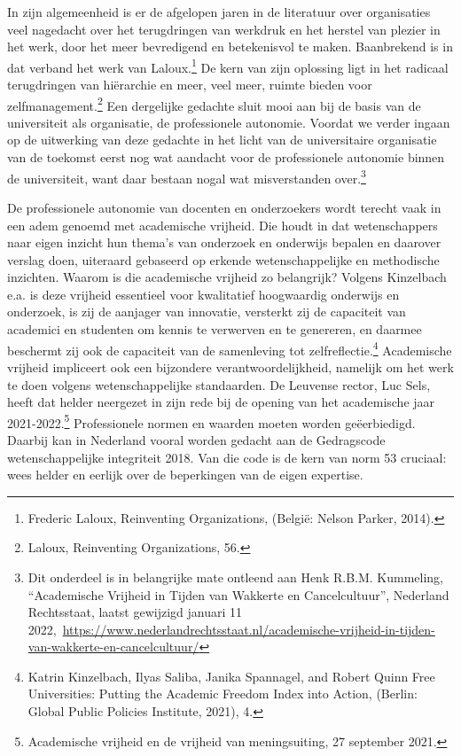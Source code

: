 \documentclass[empirical, authordate, ]{new-jote-article}
\begin{document}
	In zijn algemeenheid is er de afgelopen jaren in de literatuur over organisaties veel nagedacht over het terugdringen van werkdruk en het herstel van plezier in het werk, door het meer bevredigend en betekenisvol te maken. Baanbrekend is in dat verband het werk van Laloux.\footnote{Frederic Laloux, Reinventing Organizations, (België: Nelson Parker, 2014).} De kern van zijn oplossing ligt in het radicaal terugdringen van hiërarchie en meer, veel meer, ruimte bieden voor zelfmanagement.\footnote{Laloux, Reinventing Organizations, 56.} Een dergelijke gedachte sluit mooi aan bij de basis van de universiteit als organisatie, de professionele autonomie. Voordat we verder ingaan op de uitwerking van deze gedachte in het licht van de universitaire organisatie van de toekomst eerst nog wat aandacht voor de professionele autonomie binnen de universiteit, want daar bestaan nogal wat misverstanden over.\footnote{Dit onderdeel is in belangrijke mate ontleend aan Henk R.B.M. Kummeling, “Academische Vrijheid in Tijden van Wakkerte en Cancelcultuur”, Nederland Rechtsstaat, laatst gewijzigd januari 11 2022, \href{https://www.nederlandrechtsstaat.nl/academische-vrijheid-in-tijden-van-wakkerte-en-cancelcultuur/}{https://www.nederlandrechtsstaat.nl/academische-vrijheid-in-tijden-van-wakkerte-en-cancelcultuur/}}



	De professionele autonomie van docenten en onderzoekers wordt terecht vaak in een adem genoemd met academische vrijheid. Die houdt in dat wetenschappers naar eigen inzicht hun thema's van onderzoek en onderwijs bepalen en daarover verslag doen, uiteraard gebaseerd op erkende wetenschappelijke en methodische inzichten. Waarom is die academische vrijheid zo belangrijk? Volgens Kinzelbach e.a. is deze vrijheid essentieel voor kwalitatief hoogwaardig onderwijs en onderzoek, is zij de aanjager van innovatie, versterkt zij de capaciteit van academici en studenten om kennis te verwerven en te genereren, en daarmee beschermt zij ook de capaciteit van de samenleving tot zelfreflectie.\footnote{Katrin Kinzelbach, Ilyas Saliba, Janika Spannagel, and Robert Quinn Free Universities: Putting the Academic Freedom Index into Action, (Berlin: Global Public Policies Institute, 2021), 4.} Academische vrijheid impliceert ook een bijzondere verantwoordelijkheid, namelijk om het werk te doen volgens wetenschappelijke standaarden. De Leuvense rector, Luc Sels, heeft dat helder neergezet in zijn rede bij de opening van het academische jaar 2021-2022.\footnote{Academische vrijheid en de vrijheid van meningsuiting, 27 september 2021.} Professionele normen en waarden moeten worden geëerbiedigd. Daarbij kan in Nederland vooral worden gedacht aan de Gedragscode wetenschappelijke integriteit 2018. Van die code is de kern van norm 53 cruciaal: wees helder en eerlijk over de beperkingen van de eigen expertise.
\end{document}
